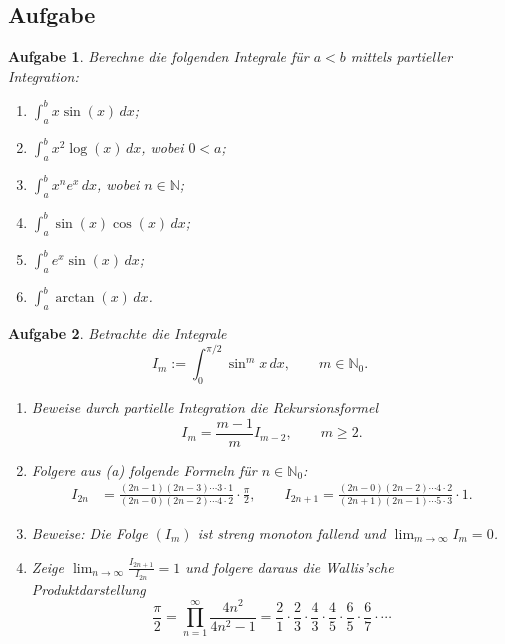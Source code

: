 \documentclass{article}
\newtheorem{prob}{Aufgabe}
\begin{document}
\subsection*{Aufgabe}

\begin{prob} 
Berechne die folgenden Integrale f\"ur $a<b$ mittels partieller Integration:

\begin{enumerate}
\item $\int_a^b x\sin(x)\,dx$;
\item $\int_a^b x^2\log(x)\,dx$, wobei $0<a$;
\item $\int_a^b x^n e^x\,dx$, wobei $n\in\mathbb{N}$;
\item $\int_a^b \sin(x)\cos(x)\,dx$;
\item $\int_a^b e^x\sin(x)\,dx$;
\item $\int_a^b \arctan(x)\,dx$.
\end{enumerate}
\end{prob}

\begin{prob}
Betrachte die Integrale
$$
   I_m := \int_0^{\pi/2}\sin^mx\,dx,\qquad m\in\mathbb{N}_0.
$$
\begin{enumerate}
\item Beweise durch partielle Integration die Rekursionsformel
$$
   I_m = \frac{m-1}{m}I_{m-2},\qquad m\geq 2.
$$
\item Folgere aus (a) folgende Formeln f\"ur $n\in\mathbb{N}_0$:
\begin{align*}
   I_{2n} &= \frac{(2n-1)(2n-3)\cdots 3\cdot 1}{(2n-0)(2n-2)\cdots 4\cdot 2}\cdot\frac{\pi}{2},\qquad
   I_{2n+1} = \frac{(2n-0)(2n-2)\cdots 4\cdot 2}{(2n+1)(2n-1)\cdots 5\cdot 3}\cdot 1.
\end{align*}
\item Beweise: 
Die Folge $(I_m)$ ist streng monoton fallend und $\lim_{m\to\infty}I_m=0$.
\item Zeige $\lim_{n\to\infty}\frac{I_{2n+1}}{I_{2n}}=1$ und folgere
daraus die {\em Wallis'sche Produktdarstellung}
$$
   \frac{\pi}{2} = \prod_{n=1}^\infty \frac{4n^2}{4n^2-1} = \frac{2}{1} \cdot \frac{2}{3} \cdot \frac{4}{3} \cdot \frac{4}{5} \cdot \frac{6}{5} \cdot \frac{6}{7} \cdot \cdots
$$
\end{enumerate}
\end{prob}
\end{document}
